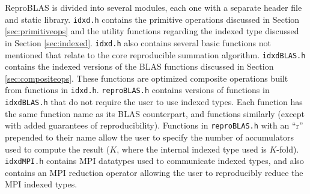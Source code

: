  ReproBLAS is divided into several modules, each one with a separate header file and static library. \texttt{idxd.h} contains the primitive operations discussed in Section \ref{sec:primitiveops} and the utility functions regarding the indexed type discussed in Section \ref{sec:indexed}. \texttt{idxd.h} also contains several basic functions not mentioned that relate to the core reproducible summation algorithm. \texttt{idxdBLAS.h} contains the indexed versions of the BLAS functions discussed in Section \ref{sec:compositeops}. These functions are optimized composite operations built from functions in \texttt{idxd.h}. \texttt{reproBLAS.h} contains versions of functions in \texttt{idxdBLAS.h} that do not require the user to use indexed types. Each function has the same function name as its BLAS counterpart, and functions similarly (except with added guarantees of reproducibility). Functions in \texttt{reproBLAS.h} with an ``r'' prepended to their name allow the user to specify the number of accumulators used to compute the result ($K$, where the internal indexed type used is $K$-fold). \texttt{idxdMPI.h} contains MPI datatypes used to communicate indexed types, and also contains an MPI reduction operator allowing the user to reproducibly reduce the MPI indexed types.
  
  
